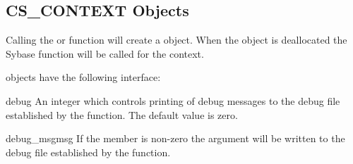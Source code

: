 \subsection{CS_CONTEXT Objects}

Calling the  or 
function will create a  object.  When the
 object is deallocated the Sybase
 function will be called for the context.

 objects have the following interface:

\begin{memberdesc}[CS_CONTEXT]{debug}
An integer which controls printing of debug messages to the debug file
established by the  function.  The default value
is zero.
\end{memberdesc}

\begin{methoddesc}[CS_CONTEXT]{debug_msg}{msg}
If the  member is non-zero the  argument will
be written to the debug file established by the 
function.
\end{methoddesc}

